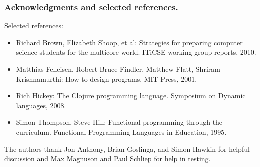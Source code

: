 \documentclass{beamer}
\begin{document}
\begin{frame}
\frametitle{Acknowledgments and selected references.}
Selected references:
\begin{itemize}
\item Richard Brown, Elizabeth Shoop, et al: Strategies for preparing computer science students for the multicore world.  ITiCSE working group reports, 2010.
\item Matthias Felleisen, Robert Bruce Findler, Matthew Flatt, Shriram Krishnamurthi: How to design
programs. MIT Press, 2001.
\item Rich Hickey: The Clojure programming language. Symposium on
Dynamic languages, 2008. 
\item Simon Thompson, Steve Hill: Functional programming through the curriculum. Functional
Programming Languages in Education, 1995. 
\end{itemize}
The authors thank Jon Anthony, Brian Goslinga, and Simon Hawkin for helpful discussion and Max Magnuson and Paul Schliep for help in testing. 
\end{frame}
\end{document}
